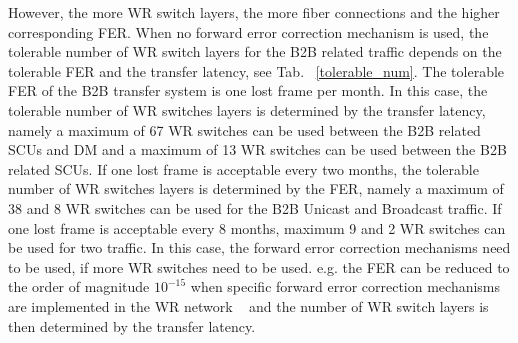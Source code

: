 However, the more WR switch layers, the more fiber connections and the higher corresponding FER. When no forward error correction mechanism is used, the tolerable number of WR switch layers for the B2B related traffic depends on the tolerable FER and the transfer latency, see Tab. ~\ref{tolerable_num}. The tolerable FER of the B2B transfer system is one lost frame per month. In this case, the tolerable number of WR switches layers is determined by the transfer latency, namely a maximum of 67 WR switches can be used between the B2B related SCUs and DM and a maximum of 13 WR switches can be used between the B2B related SCUs. If one lost frame is acceptable every two months, the tolerable number of WR switches layers is determined by the FER, namely a maximum of 38 and 8 WR switches can be used for the B2B Unicast and Broadcast traffic. If one lost frame is acceptable every 8 months, maximum 9 and 2 WR switches can be used for two traffic. In this case, the forward error correction mechanisms need to be used, if more WR switches need to be used. e.g. the FER can be reduced to the order of magnitude $10^{-15}$ when specific forward error correction mechanisms are implemented in the WR network ~\cite{prados_white_2011} and the number of WR switch layers is then determined by the transfer latency. 
